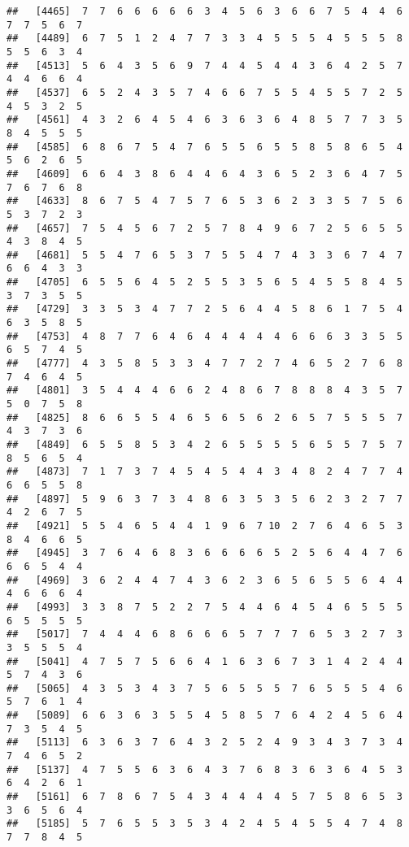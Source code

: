 \documentclass[
]{book}
\begin{document}
\begin{verbatim}
##   [4465]  7  7  6  6  6  6  6  3  4  5  6  3  6  6  7  5  4  4  6  7  7  5  6  7
##   [4489]  6  7  5  1  2  4  7  7  3  3  4  5  5  5  4  5  5  5  8  5  5  6  3  4
##   [4513]  5  6  4  3  5  6  9  7  4  4  5  4  4  3  6  4  2  5  7  4  4  6  6  4
##   [4537]  6  5  2  4  3  5  7  4  6  6  7  5  5  4  5  5  7  2  5  4  5  3  2  5
##   [4561]  4  3  2  6  4  5  4  6  3  6  3  6  4  8  5  7  7  3  5  8  4  5  5  5
##   [4585]  6  8  6  7  5  4  7  6  5  5  6  5  5  8  5  8  6  5  4  5  6  2  6  5
##   [4609]  6  6  4  3  8  6  4  4  6  4  3  6  5  2  3  6  4  7  5  7  6  7  6  8
##   [4633]  8  6  7  5  4  7  5  7  6  5  3  6  2  3  3  5  7  5  6  5  3  7  2  3
##   [4657]  7  5  4  5  6  7  2  5  7  8  4  9  6  7  2  5  6  5  5  4  3  8  4  5
##   [4681]  5  5  4  7  6  5  3  7  5  5  4  7  4  3  3  6  7  4  7  6  6  4  3  3
##   [4705]  6  5  5  6  4  5  2  5  5  3  5  6  5  4  5  5  8  4  5  3  7  3  5  5
##   [4729]  3  3  5  3  4  7  7  2  5  6  4  4  5  8  6  1  7  5  4  6  3  5  8  5
##   [4753]  4  8  7  7  6  4  6  4  4  4  4  4  6  6  6  3  3  5  5  6  5  7  4  5
##   [4777]  4  3  5  8  5  3  3  4  7  7  2  7  4  6  5  2  7  6  8  7  4  6  4  5
##   [4801]  3  5  4  4  4  6  6  2  4  8  6  7  8  8  8  4  3  5  7  5  0  7  5  8
##   [4825]  8  6  6  5  5  4  6  5  6  5  6  2  6  5  7  5  5  5  7  4  3  7  3  6
##   [4849]  6  5  5  8  5  3  4  2  6  5  5  5  5  6  5  5  7  5  7  8  5  6  5  4
##   [4873]  7  1  7  3  7  4  5  4  5  4  4  3  4  8  2  4  7  7  4  6  6  5  5  8
##   [4897]  5  9  6  3  7  3  4  8  6  3  5  3  5  6  2  3  2  7  7  4  2  6  7  5
##   [4921]  5  5  4  6  5  4  4  1  9  6  7 10  2  7  6  4  6  5  3  8  4  6  6  5
##   [4945]  3  7  6  4  6  8  3  6  6  6  6  5  2  5  6  4  4  7  6  6  6  5  4  4
##   [4969]  3  6  2  4  4  7  4  3  6  2  3  6  5  6  5  5  6  4  4  4  6  6  6  4
##   [4993]  3  3  8  7  5  2  2  7  5  4  4  6  4  5  4  6  5  5  5  6  5  5  5  5
##   [5017]  7  4  4  4  6  8  6  6  6  5  7  7  7  6  5  3  2  7  3  3  5  5  5  4
##   [5041]  4  7  5  7  5  6  6  4  1  6  3  6  7  3  1  4  2  4  4  5  7  4  3  6
##   [5065]  4  3  5  3  4  3  7  5  6  5  5  5  7  6  5  5  5  4  6  5  7  6  1  4
##   [5089]  6  6  3  6  3  5  5  4  5  8  5  7  6  4  2  4  5  6  4  7  3  5  4  5
##   [5113]  6  3  6  3  7  6  4  3  2  5  2  4  9  3  4  3  7  3  4  7  4  6  5  2
##   [5137]  4  7  5  5  6  3  6  4  3  7  6  8  3  6  3  6  4  5  3  6  4  2  6  1
##   [5161]  6  7  8  6  7  5  4  3  4  4  4  4  5  7  5  8  6  5  3  3  6  5  6  4
##   [5185]  5  7  6  5  5  3  5  3  4  2  4  5  4  5  5  4  7  4  8  7  7  8  4  5

\end{verbatim}
\end{document}
